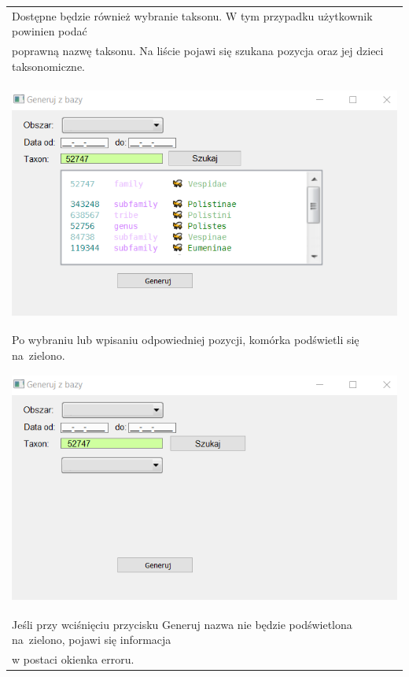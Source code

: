 \documentclass{article}
\begin{document}
\begin{center}
\begin{tabular}{l}
Dostępne będzie również wybranie taksonu. W tym przypadku użytkownik powinien podać \\poprawną nazwę taksonu. Na liście pojawi się szukana pozycja oraz jej dzieci taksonomiczne.\\\\
\\\\\includegraphics[scale = 1]{"gzb4.png"}\\\\
\\Po wybraniu lub wpisaniu odpowiedniej pozycji, komórka podświetli się na~zielono.\\\\
\\\includegraphics[scale = 1]{"gzb5.png"}\\\\
\\Jeśli przy wciśnięciu przycisku Generuj nazwa nie będzie podświetlona na~zielono, pojawi się informacja \\w postaci okienka erroru.
\end{tabular}
\end{center}
\end{document}
